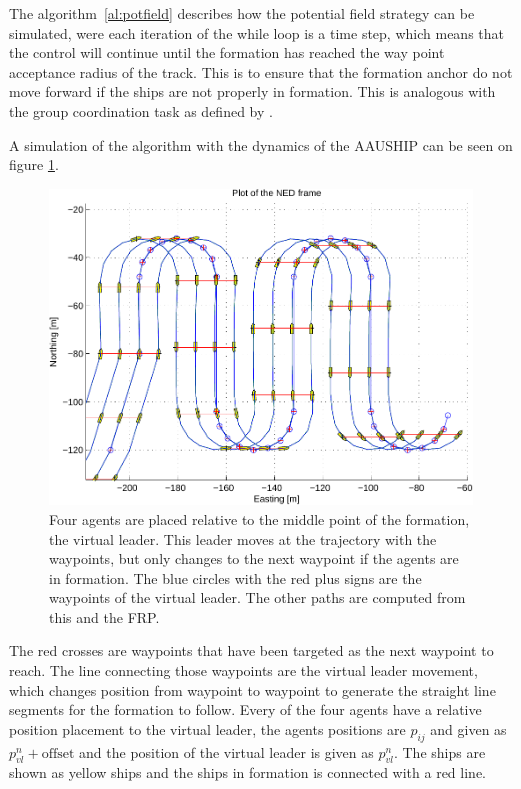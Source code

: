 \documentclass[a4paper,conference]{IEEEtran}
\begin{document}
The algorithm~\vref{al:potfield} describes how the potential field
strategy can be simulated, were each iteration of the while loop is a
time step, which means that the control will continue until the
formation has reached the way point acceptance radius of the track.
This is to ensure that the formation anchor do not move forward if the
ships are not properly in formation. This is analogous with the group
coordination task as defined by \citep{thorvaldsen}.

A simulation of the algorithm with the dynamics of the AAUSHIP can be seen on figure \ref{fig:potform}.
\begin{figure}[htbp]
  \centering
  \includegraphics[width=\linewidth]{fig/lawn-bar-formation}
  \caption{Four agents are placed relative to the middle point of the
	formation, the virtual leader. This leader moves at the trajectory
with the waypoints, but only changes to the next waypoint if the
agents are in formation. The blue circles with the red plus signs are
the waypoints of the virtual leader. The other paths are computed from
this and the FRP.}
  \label{fig:potform}
\end{figure}
The red crosses are waypoints that have been targeted as the next waypoint to reach. The line connecting those waypoints are the virtual leader movement, which changes position from waypoint to waypoint to generate the straight line segments for the formation to follow. Every of the four agents have a relative position placement to the virtual leader, the agents positions are $p_{ij}$ and given as $p^n_{vl} + \text{offset}$ and the position of the virtual leader is given as $p^n_{vl}$. The ships are shown as yellow ships and the ships in formation is connected with a red line.
\end{document}
